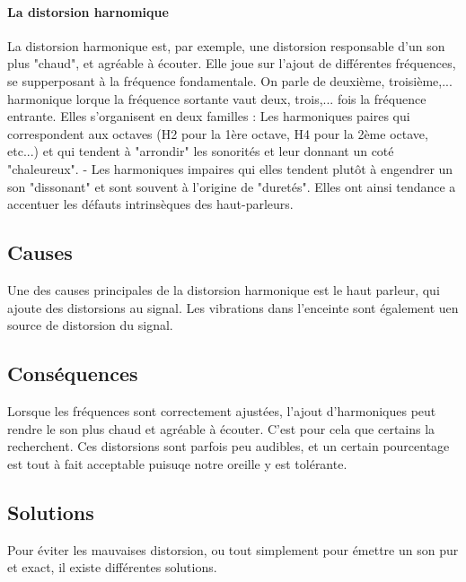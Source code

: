 \documentclass{article}
\begin{document}
\paragraph{La distorsion harnomique}
La distorsion harmonique est, par exemple, une distorsion responsable 
d'un son plus "chaud", et agréable à écouter. Elle joue sur l'ajout de différentes fréquences, se 
supperposant à la fréquence fondamentale. On parle de deuxième, troisième,... harmonique lorque la 
fréquence sortante vaut deux, trois,... fois la fréquence entrante. Elles s'organisent en deux familles : 
Les harmoniques paires qui correspondent aux octaves (H2 pour la 1ère octave, H4 pour la 2ème octave, etc...) 
et qui tendent à "arrondir" les sonorités et leur donnant un coté "chaleureux".
- Les harmoniques impaires qui elles tendent plutôt à engendrer un son "dissonant" et sont souvent à 
l'origine de "duretés". Elles ont ainsi tendance a accentuer les défauts intrinsèques des haut-parleurs.

\subsection{Causes}
Une des causes principales de la distorsion harmonique est le haut parleur, qui ajoute des distorsions au signal.
Les vibrations dans l'enceinte sont également uen source de distorsion du signal.

\subsection{Conséquences}
Lorsque les fréquences sont correctement ajustées, l'ajout d'harmoniques peut rendre le son plus chaud et 
agréable à écouter. C'est pour cela que certains la recherchent.
Ces distorsions sont parfois peu audibles, et un certain pourcentage est tout à fait acceptable puisuqe notre
oreille y est tolérante.

\subsection{Solutions}
Pour éviter les mauvaises distorsion, ou tout simplement pour émettre un son pur et exact, il existe différentes
solutions.




\end{document}
